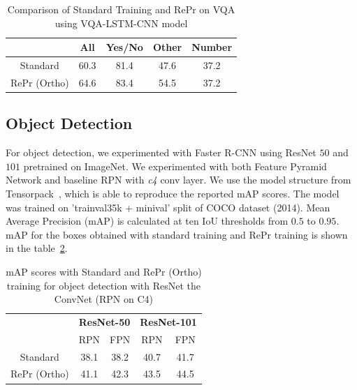 \begin{table}[H]
\center
{}
\begin{tabular}{ccccc}
        \toprule
         & \textbf{All} & \textbf{Yes/No} & \textbf{Other} & \textbf{Number} \\ \midrule
Standard & 60.3    &    81.4    &  47.6     &  37.2      \\
RePr (Ortho)    & {\color[HTML]{3166FF} 64.6}    &  {\color[HTML]{3166FF} 83.4}      &  {\color[HTML]{3166FF} 54.5}     &  37.2     \\ \bottomrule
\end{tabular}
\caption[Results on VQA]{Comparison of Standard Training and RePr on VQA using VQA-LSTM-CNN model}
\label{tbl:vqa}
\end{table}

\subsection{Object Detection}

For object detection, we experimented with Faster R-CNN using ResNet $50$ and $101$ pretrained on ImageNet.
We experimented with both Feature Pyramid Network and baseline RPN with \textit{c4} conv layer.
We use the model structure from Tensorpack~\cite{wu2016tensorpack}, which is able to reproduce the reported mAP scores.
The model was trained on 'trainval35k + minival' split of COCO dataset (2014). 
Mean Average Precision (mAP) is calculated at ten IoU thresholds from $0.5$ to $0.95$. 
mAP for the boxes obtained with standard training and RePr training is shown in the table~\ref{tbl:rpn}.

\begin{table}[H]
\center
{}
\begin{tabular}{ccccc}
        \toprule
         & \multicolumn{2}{l}{\textbf{ResNet-50}} & \multicolumn{2}{l}{\textbf{ResNet-101}} \\
         & RPN           & FPN           & RPN           & FPN           \\ \midrule
Standard  &      38.1  & 38.2      &  40.7     & 41.7\\
RePr (Ortho) &   {\color[HTML]{3166FF} 41.1}  & {\color[HTML]{3166FF} 42.3}     &   {\color[HTML]{3166FF} 43.5}     & {\color[HTML]{3166FF} 44.5}       \\ \bottomrule
\end{tabular}
\caption[Results on Object Detection]{mAP scores with Standard and RePr (Ortho) training for object detection with ResNet the ConvNet (RPN on C4)}
\label{tbl:rpn}
\end{table}

